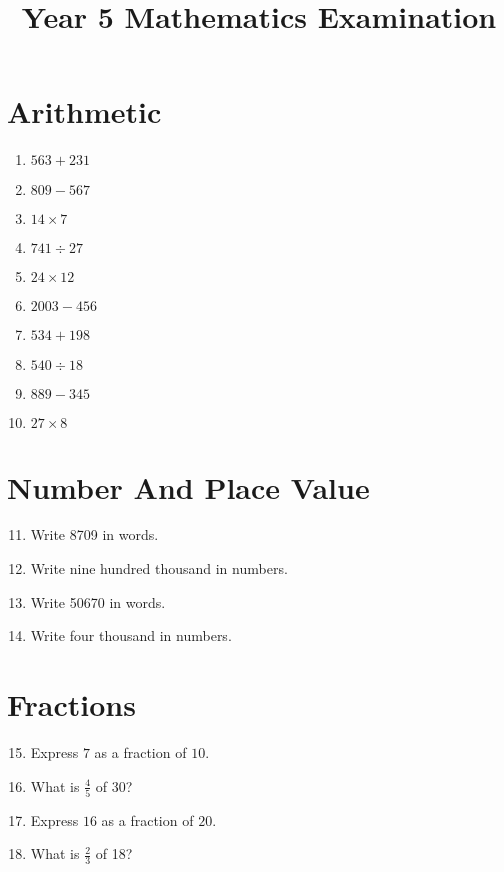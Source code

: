 \documentclass[10pt,a4paper]{article}
\begin{document}
\title{Year 5 Mathematics Examination}
\date{}
\maketitle

\section*{Arithmetic}

\begin{enumerate}
\item $563 + 231$
\item $809 - 567$
\item $14 \times 7$
\item $741 \div 27$
\item $24 \times 12$
\item $2003 - 456$
\item $534 + 198$
\item $540 \div 18$
\item $889 - 345$
\item $27 \times 8$
\end{enumerate}

\section*{Number And Place Value}

\begin{enumerate}
\setcounter{enumi}{10}
\item Write 8709 in words.
\item Write nine hundred thousand in numbers.
\item Write 50670 in words.
\item Write four thousand in numbers.
\end{enumerate}

\section*{Fractions}

\begin{enumerate}
\setcounter{enumi}{14}
\item Express $7$ as a fraction of $10$.
\item What is $\frac{4}{5}$ of 30?
\item Express $16$ as a fraction of $20$.
\item What is $\frac{2}{3}$ of 18?
\end{enumerate}
\end{document}
